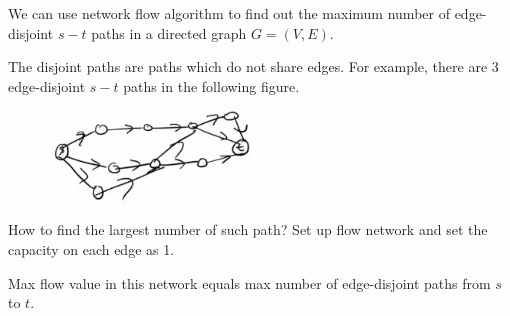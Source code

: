 We can use network flow algorithm to find out the maximum number of edge-disjoint $s-t$ paths in a directed graph $G = (V, E)$.

The disjoint paths are paths which do not share edges. For example, there are $3$ edge-disjoint $s-t$ paths in the following figure.

\begin{figure}[H]
	\centering
	\includegraphics[width=0.5\textwidth]{fig/disjoint-path-eg.png}
\end{figure} 

How to find the largest number of such path? Set up flow network and set the capacity on each edge as 1.

\begin{theorem}
	Max flow value in this network equals max number of edge-disjoint paths from $s$ to $t$.
\end{theorem}

